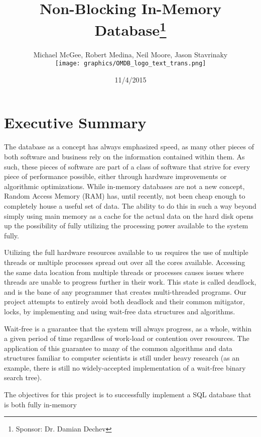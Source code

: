 \documentclass[letterpaper, 12pt]{article}
\title{Non-Blocking In-Memory Database\thanks{Sponsor: Dr. Damian Dechev}}
\author{Michael McGee, Robert Medina, Neil Moore, Jason Stavrinaky\\[1ex]
	\texttt{[image: graphics/OMDB\_logo\_text\_trans.png]}\\[1ex]
}
\date{11/4/2015}
\begin{document}
\maketitle
\newpage

\tableofcontents
\newpage


\section{Executive Summary}
The database as a concept has always emphasized speed, as many other pieces of both software
and business rely on the information contained within them. As such, these pieces of software
are part of a class of software that strive for every piece of performance possible, either through
hardware improvements or algorithmic optimizations. While in-memory databases are not a new concept,
Random Access Memory (RAM) has, until recently, not been cheap enough to completely house a useful
set of data. The ability to do this in such a way beyond simply using main memory as a cache for the 
actual data on the hard disk opens up the possibility of fully utilizing the processing power
available to the system fully.
\par\vspace{\baselineskip}
Utilizing the full hardware resources available to us requires the use of multiple threads or 
multiple processes spread out over all the cores available. Accessing the same data location 
from multiple threads or processes causes issues where threads are unable to progress further in their
work. This state is called deadlock, and is the bane of any programmer that creates multi-threaded
programs. Our project attempts to entirely avoid both deadlock and their common mitigator, locks,
by implementing and using wait-free data structures and algorithms.
\par\vspace{\baselineskip}
Wait-free is a guarantee that the system will always progress, as a whole, within a given period of time
regardless of work-load or contention over resources. The application of this guarantee to many
of the common algorithms and data structures familiar to computer scientists is still under heavy research
(as an example, there is still no widely-accepted implementation of a wait-free binary search tree).
\par\vspace{\baselineskip}
The objectives for this project is to successfully implement a SQL database that is both fully in-memory
\end{document}
